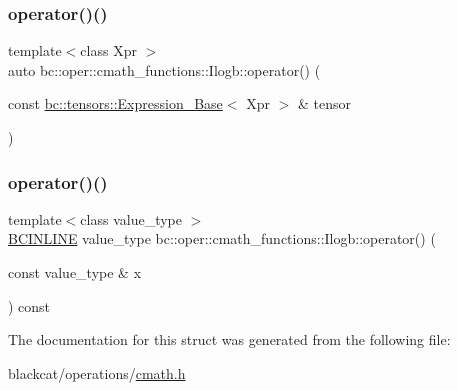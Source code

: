 \mbox{\label{structbc_1_1oper_1_1cmath__functions_1_1Ilogb_a3c8c4f715782e316ad71f9c15ca02758}} 
\subsubsection{\texorpdfstring{operator()()}{operator()()}\hspace{0.1cm}{\footnotesize\ttfamily [2/3]}}
{\footnotesize\ttfamily template$<$class Xpr $>$ \\
auto bc\+::oper\+::cmath\+\_\+functions\+::\+Ilogb\+::operator() (\begin{DoxyParamCaption}\item[{const \hyperlink{classbc_1_1tensors_1_1Expression__Base}{bc\+::tensors\+::\+Expression\+\_\+\+Base}$<$ Xpr $>$ \&}]{tensor }\end{DoxyParamCaption})\hspace{0.3cm}{\ttfamily [inline]}}

\mbox{\label{structbc_1_1oper_1_1cmath__functions_1_1Ilogb_a30fcdda2aa70dddb9f5e6e1eac57c571}} 
\subsubsection{\texorpdfstring{operator()()}{operator()()}\hspace{0.1cm}{\footnotesize\ttfamily [3/3]}}
{\footnotesize\ttfamily template$<$class value\+\_\+type $>$ \\
\hyperlink{common_8h_a6699e8b0449da5c0fafb878e59c1d4b1}{B\+C\+I\+N\+L\+I\+NE} value\+\_\+type bc\+::oper\+::cmath\+\_\+functions\+::\+Ilogb\+::operator() (\begin{DoxyParamCaption}\item[{const value\+\_\+type \&}]{x }\end{DoxyParamCaption}) const\hspace{0.3cm}{\ttfamily [inline]}}



The documentation for this struct was generated from the following file\+:\begin{DoxyCompactItemize}
\item 
blackcat/operations/\hyperlink{cmath_8h}{cmath.\+h}\end{DoxyCompactItemize}
